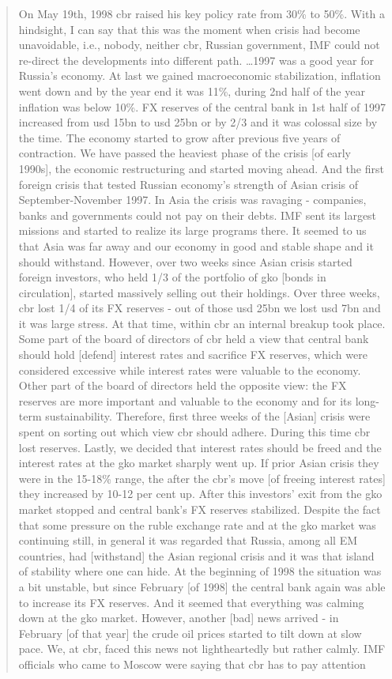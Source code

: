 \begin{quote}
On May 19th, 1998 \ac{cbr} raised his key policy rate from 30\% to 50\%. With a hindsight, I can say that this was the moment when crisis had become unavoidable, i.e., nobody, neither \ac{cbr}, Russian government, IMF could not re-direct the developments into different path. \dots 1997 was a good year for Russia's economy. At last we gained macroeconomic stabilization, inflation went down and by the year end it was 11\%, during 2nd half of the year inflation was below 10\%. FX reserves of the central bank in 1st half of 1997 increased from \ac{usd} 15bn to \ac{usd} 25bn or by 2/3 and it was colossal size by the time. The economy started to grow after previous five years of contraction. We have passed the heaviest phase of the crisis [of early 1990s], the economic restructuring and started moving ahead. And the first foreign crisis that tested Russian economy's strength of Asian crisis of September-November 1997. In Asia the crisis was ravaging - companies, banks and governments could not pay on their debts. IMF sent its largest missions and started to realize its large programs there. It seemed to us that Asia was far away and our economy in good and stable shape and it should withstand. However, over two weeks since Asian crisis started foreign investors, who held 1/3 of the portfolio of \ac{gko} [bonds in circulation], started massively selling out their holdings. Over three weeks, \ac{cbr} lost 1/4 of its FX reserves - out of those \ac{usd} 25bn we lost \ac{usd} 7bn and it was large stress. At that time, within \ac{cbr} an internal breakup took place. Some part of the board of directors of \ac{cbr} held a view that central bank should hold [defend] interest rates and sacrifice FX reserves, which were considered excessive while interest rates were valuable to the economy. Other part of the board of directors held the opposite view: the FX reserves are more important and valuable to the economy and for its long-term sustainability. Therefore, first three weeks of the [Asian] crisis were spent on sorting out which view \ac{cbr} should adhere. During this time \ac{cbr} lost reserves. Lastly, we decided that interest rates should be freed and the interest rates at the \ac{gko} market sharply went up. If prior Asian crisis they were in the 15-18\% range, the after the \ac{cbr}'s move [of freeing interest rates] they increased by 10-12 per cent up. After this investors' exit from the \ac{gko} market stopped and central bank's FX reserves stabilized. Despite the fact that some pressure on the ruble exchange rate and at the \ac{gko} market was continuing still, in general it was regarded that Russia, among all EM countries, had [withstand] the Asian regional crisis and it was that island of stability where one can hide. At the beginning of 1998 the situation was a bit unstable, but since February [of 1998] the central bank again was able to increase its FX reserves. And it seemed that everything was calming down at the \ac{gko} market. However, another [bad] news arrived - in February [of that year] the crude oil prices started to tilt down at slow pace. We, at \ac{cbr}, faced this news not lightheartedly but rather calmly. IMF officials who came to Moscow were saying that \ac{cbr} has to pay attention 
\end{quote}
